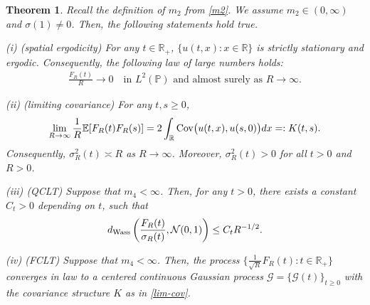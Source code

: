 \documentclass[letterpaper, 11pt,  reqno]{amsart}
\newtheorem{theorem}{Theorem} [section]
\newcommand{\noi}{\noindent}
\newcommand{\R}{\mathbb{R}}
\newcommand{\bE}{\mathbb{E}}
\newcommand{\bR}{\mathbb{R}}
\newcommand{\E}{\mathbb{E}}
\newcommand{\cG}{\mathcal{G}}
\newcommand{\cN}{\mathcal{N}}
\newcommand{\s}{\sigma}
\newcommand{\PP}{\mathbb{P}}
\newcommand{\dom}{\textup{dom}}
\numberwithin{equation}{section}
\numberwithin{theorem}{section}
\begin{document}
\begin{theorem}
\label{thm_main} Recall the definition of $m_2$ from \eqref{m2}.
We assume 
 $m_2 \in(0,\infty)$ and $\s(1)\not=0$. 
 Then, the following statements hold true. 


\smallskip
\noi
{\rm (i)}  \textup{(\textsf{spatial ergodicity})} For any $t\in\R_+$, $\{u(t,x) :x\in \bR\}$ is strictly stationary and ergodic.  
Consequently, the following law of large numbers  holds:
\begin{align}\label{LLN}
\frac{F_R(t)}{R} \to 0 \quad \mbox{in $L^2(\PP)$ and almost surely as $R \to \infty$}.
\end{align}


\smallskip
\noi
{\rm (ii)}  \textup{(\textsf{limiting covariance})} For any $t,s\geq 0$,
\begin{equation}
\label{lim-cov}
\lim_{R \to \infty}\frac{1}{R}\bE[F_R(t)F_R(s)]=2\int_{\bR}{\rm Cov}\big(u(t,x),u(s,0) \big)dx=:K(t,s).
\end{equation}
Consequently, $\s_R^2(t)  \asymp R$ as $R\to\infty$. Moreover,  $\s_R^2(t) > 0$ for all $t>0$ and $R>0$.


\smallskip
\noi
{\rm (iii)}  \textup{(\textsf{QCLT})} Suppose that $m_4<\infty$. Then, for any $t>0$, there exists a constant $C_t>0$ depending on $t$, such that
\begin{equation}
\label{QCLT-rate}
d_{\rm Wass}\left( \frac{F_R(t)}{\s_R(t)}, \cN(0,1) \right) \leq  C_t R^{-1/2}.
\end{equation}


\smallskip
\noi
{\rm (iv)}  \textup{(\textsf{FCLT})} Suppose that $m_4<\infty$. Then,
the process $\{ \tfrac{1}{\sqrt{R}} F_R(t): t\in\R_+\}$
converges in law to a centered continuous Gaussian process $\cG=\{\cG(t)\}_{t\geq 0}$
with the covariance structure $K$ as in \eqref{lim-cov}.

\end{theorem}
\end{document}
